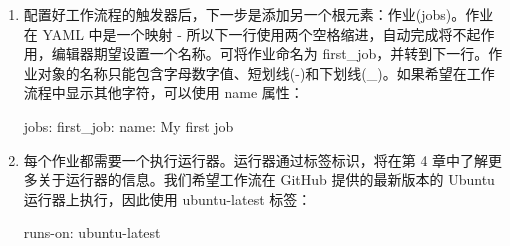 \begin{enumerate}
如果在第一个元素后面添加一个逗号，然后再次点击 Control + Space，则可以从自动完成中选择其他元素(见图 1.11)：


每个触发器都是一个映射，并且可以包含附加参数。如果将光标放在 on: 下面的行上并添加两个空格的缩进，自动完成将使用完整的 YAML 语法给出结果，还会给出可用于配置每个触发器的属性(见图 1.12)：


请注意，大多数参数 - 例如，分支或路径 - 都是序列，如果不使用 JSON 语法，则需要每个条目使用一个短划线。

我们希望测试工作流程在每次推送到 main 分支时运行，还希望能够手动进行触发(请参阅触发工作流的事件部分)。工作流触发器代码好似如下所示：

\begin{shell}
on:
  push:
    branches:
      - main
  workflow_dispatch:
\end{shell}

\begin{myNotic}{通配符}
* 字符可以用作路径中的通配符，** 用作递归通配符。* 是 YAML 中的特殊字符，所以需要使用引号：

\begin{shell}
push:
  branches:
    - 'release/**'
  paths:
    - 'doc/**'
\end{shell}
\end{myNotic}

\item 
配置好工作流程的触发器后，下一步是添加另一个根元素：作业(jobs)。作业在 YAML 中是一个映射 - 所以下一行使用两个空格缩进，自动完成将不起作用，编辑器期望设置一个名称。可将作业命名为 first\_job，并转到下一行。作业对象的名称只能包含字母数字值、短划线(-)和下划线(\_)。如果希望在工作流程中显示其他字符，可以使用 name 属性：

\begin{shell}
jobs:
  first_job:
    name: My first job
\end{shell}

\item 
每个作业都需要一个执行运行器。运行器通过标签标识，将在第 4 章中了解更多关于运行器的信息。我们希望工作流在 GitHub 提供的最新版本的 Ubuntu 运行器上执行，因此使用 ubuntu-latest 标签：

\begin{shell}
runs-on: ubuntu-latest
\end{shell}


\end{enumerate}
